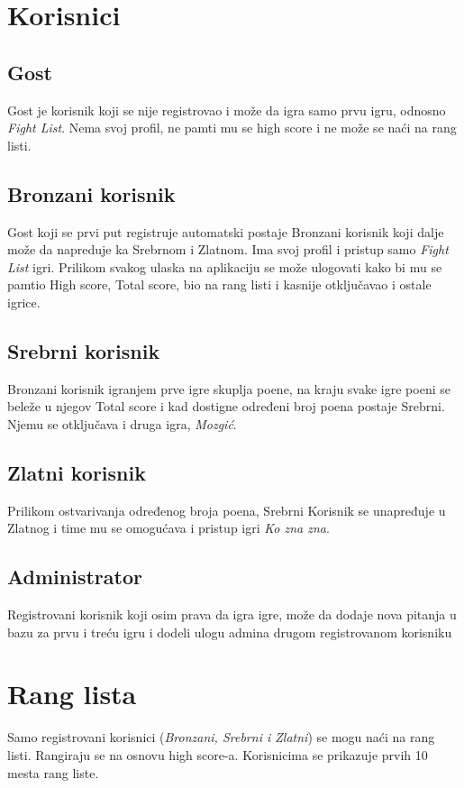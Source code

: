 \documentclass{article}
\begin{document}
\section{Korisnici}
\subsection{Gost}
Gost je korisnik koji se nije registrovao i može da igra samo prvu igru, odnosno \textit{Fight List}. 
Nema svoj profil, ne pamti mu se high score i ne može se naći na rang listi.
\subsection{Bronzani korisnik}
Gost koji se prvi put registruje automatski postaje Bronzani korisnik koji dalje može da 
napreduje ka Srebrnom i Zlatnom. Ima svoj profil i pristup samo \textit{Fight List} igri. Prilikom svakog 
ulaska na aplikaciju se može ulogovati kako bi mu se pamtio High score, Total score, bio na rang 
listi i kasnije otključavao i ostale igrice. 
\subsection{Srebrni korisnik}
Bronzani korisnik igranjem prve igre skuplja poene, na kraju svake igre poeni se beleže u 
njegov Total score i kad dostigne određeni broj poena postaje Srebrni. Njemu se otključava i 
druga igra, \textit{Mozgić}. 
\subsection{Zlatni korisnik}
Prilikom ostvarivanja određenog broja poena, Srebrni Korisnik se unapređuje u Zlatnog i 
time mu se omogućava i pristup igri \textit{Ko zna zna}. 
\subsection{Administrator}
Registrovani korisnik koji osim prava da igra igre, može da dodaje nova pitanja u bazu za 
prvu i treću igru i dodeli ulogu admina drugom registrovanom korisniku
\newpage
\section{Rang lista}
Samo registrovani korisnici (\textit{Bronzani, Srebrni i Zlatni}) se mogu naći na rang listi. Rangiraju se na osnovu 
high score-a. Korisnicima se prikazuje prvih 10 mesta rang liste.
\end{document}
